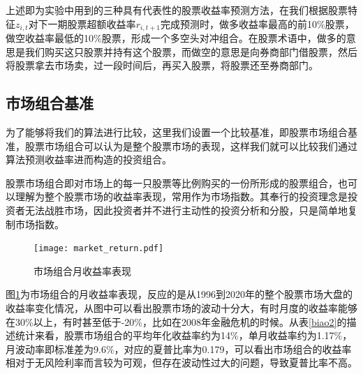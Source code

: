 \documentclass[12pt]{article} %
\begin{document}
	
	
	
	上述即为实验中用到的三种具有代表性的股票收益率预测方法，在我们根据股票特征$z_{i,t}$对下一期股票超额收益率$r_{i,t+1}$完成预测时，做多收益率最高的前10\%股票，做空收益率最低的10\%股票，形成一个多空头对冲组合。在股票术语中，做多的意思是我们购买这只股票并持有这个股票，而做空的意思是向券商部门借股票，然后将股票拿去市场卖，过一段时间后，再买入股票，将股票还至券商部门。
	
	\subsection{市场组合基准 \label{S4.2}}
	为了能够将我们的算法进行比较，这里我们设置一个比较基准，即股票市场组合基准，股票市场组合可以认为是整个股票市场的表现，这样我们就可以比较我们通过算法预测收益率进而构造的投资组合。
	
	股票市场组合即对市场上的每一只股票等比例购买的一份所形成的股票组合，也可以理解为整个股票市场的收益率表现，常用作为市场指数。其奉行的投资理念是投资者无法战胜市场，因此投资者并不进行主动性的投资分析和分股，只是简单地复制市场指数。
	\begin{figure}[ht]
		
		\centering
		\texttt{[image: market\_return.pdf]}
		\caption{市场组合月收益率表现}
		\label{marketret}
	\end{figure}

	图\ref{marketret}为市场组合的月收益率表现，反应的是从1996到2020年的整个股票市场大盘的收益率变化情况，从图中可以看出股票市场的波动十分大，有时月度的收益率能够在30\%以上，有时甚至低于-20\%，比如在2008年金融危机的时候。从表\ref{biao2}的描述统计来看，股票市场组合的平均年化收益率约为14\%，单月收益率约为1.17\%，月波动率即标准差为9.6\%，对应的夏普比率为0.179，可以看出市场组合的收益率相对于无风险利率而言较为可观，但存在波动性过大的问题，导致夏普比率不高。
	
\end{document}
